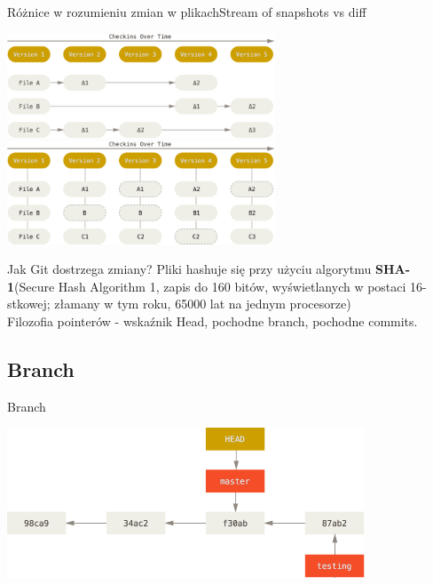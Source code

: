 \documentclass{beamer}
\begin{document}
\begin{frame}{Różnice w rozumieniu zmian w plikach}{Stream of snapshots vs diff}
  \begin{center}
   \includegraphics[width=0.6\textwidth]{./obrazki/fig-1_4.png}\\
   \includegraphics[width=0.6\textwidth]{./obrazki/fig-1_5.png}
 \end{center}

\end{frame}

\begin{frame}{Jak Git dostrzega zmiany?}
 Pliki hashuje się przy użyciu algorytmu \textbf{SHA-1}(Secure Hash Algorithm 1, zapis do 160 bitów, wyświetlanych w postaci 16-stkowej; złamany w tym roku, 65000 lat na jednym procesorze) \\
 Filozofia pointerów - wskaźnik Head, pochodne branch, pochodne commits.
\end{frame}

\subsection{Branch}
\begin{frame}{Branch}
   \begin{center}
   \includegraphics[width=0.8\textwidth]{./obrazki/fig-3_8.png}
 \end{center}
\end{frame}
\end{document}
